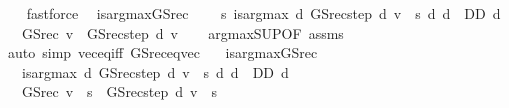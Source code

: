 \begin{isabellebody}
\ \ \isamarkupfalse%
\ fastforce%
\endisatagproof
{\isafoldproof}%
%
\isadelimproof
\isanewline
%
\endisadelimproof
\isanewline
{}\isamarkupfalse%
\isanewline
\ \ is{\isacharunderscore}{\kern0pt}arg{\isacharunderscore}{\kern0pt}max{\isacharunderscore}{\kern0pt}GS{\isacharunderscore}{\kern0pt}rec{\isacharcolon}{\kern0pt}\ \isanewline
\ \ \ {\isachardoublequoteopen}{\isasymAnd}s{\isachardot}{\kern0pt}\ is{\isacharunderscore}{\kern0pt}arg{\isacharunderscore}{\kern0pt}max\ {\isacharparenleft}{\kern0pt}{\isasymlambda}d{\isachardot}{\kern0pt}\ GS{\isacharunderscore}{\kern0pt}rec{\isacharunderscore}{\kern0pt}step\ d\ v\ {\isachardollar}{\kern0pt}\ s{\isacharparenright}{\kern0pt}\ {\isacharparenleft}{\kern0pt}{\isasymlambda}d{\isachardot}{\kern0pt}\ d\ {\isasymin}\ D\isactrlsub D{\isacharparenright}{\kern0pt}\ d{\isachardoublequoteclose}\isanewline
\ \ \ {\isachardoublequoteopen}GS{\isacharunderscore}{\kern0pt}rec\ v\ {\isacharequal}{\kern0pt}\ GS{\isacharunderscore}{\kern0pt}rec{\isacharunderscore}{\kern0pt}step\ d\ v{\isachardoublequoteclose}\isanewline
%
\isadelimproof
\ \ %
\endisadelimproof
%
\isatagproof
{}\isamarkupfalse%
\ arg{\isacharunderscore}{\kern0pt}max{\isacharunderscore}{\kern0pt}SUP{\isacharbrackleft}{\kern0pt}OF\ assms{\isacharbrackright}{\kern0pt}\isanewline
\ \ \isamarkupfalse%
\ {\isacharparenleft}{\kern0pt}auto\ simp{\isacharcolon}{\kern0pt}\ vec{\isacharunderscore}{\kern0pt}eq{\isacharunderscore}{\kern0pt}iff\ GS{\isacharunderscore}{\kern0pt}rec{\isacharunderscore}{\kern0pt}eq{\isacharunderscore}{\kern0pt}vec\ {\isacharparenright}{\kern0pt}%
\endisatagproof
{\isafoldproof}%
%
\isadelimproof
\isanewline
%
\endisadelimproof
\isanewline
{}\isamarkupfalse%
\isanewline
\ \ is{\isacharunderscore}{\kern0pt}arg{\isacharunderscore}{\kern0pt}max{\isacharunderscore}{\kern0pt}GS{\isacharunderscore}{\kern0pt}rec{\isacharprime}{\kern0pt}{\isacharcolon}{\kern0pt}\ \isanewline
\ \ \ {\isachardoublequoteopen}is{\isacharunderscore}{\kern0pt}arg{\isacharunderscore}{\kern0pt}max\ {\isacharparenleft}{\kern0pt}{\isasymlambda}d{\isachardot}{\kern0pt}\ GS{\isacharunderscore}{\kern0pt}rec{\isacharunderscore}{\kern0pt}step\ d\ v\ {\isachardollar}{\kern0pt}\ s{\isacharparenright}{\kern0pt}\ {\isacharparenleft}{\kern0pt}{\isasymlambda}d{\isachardot}{\kern0pt}\ d\ {\isasymin}\ D\isactrlsub D{\isacharparenright}{\kern0pt}\ d{\isachardoublequoteclose}\isanewline
\ \ \ {\isachardoublequoteopen}GS{\isacharunderscore}{\kern0pt}rec\ v\ {\isachardollar}{\kern0pt}\ s\ {\isacharequal}{\kern0pt}\ GS{\isacharunderscore}{\kern0pt}rec{\isacharunderscore}{\kern0pt}step\ d\ v\ {\isachardollar}{\kern0pt}\ s{\isachardoublequoteclose}\isanewline

\end{isabellebody}
